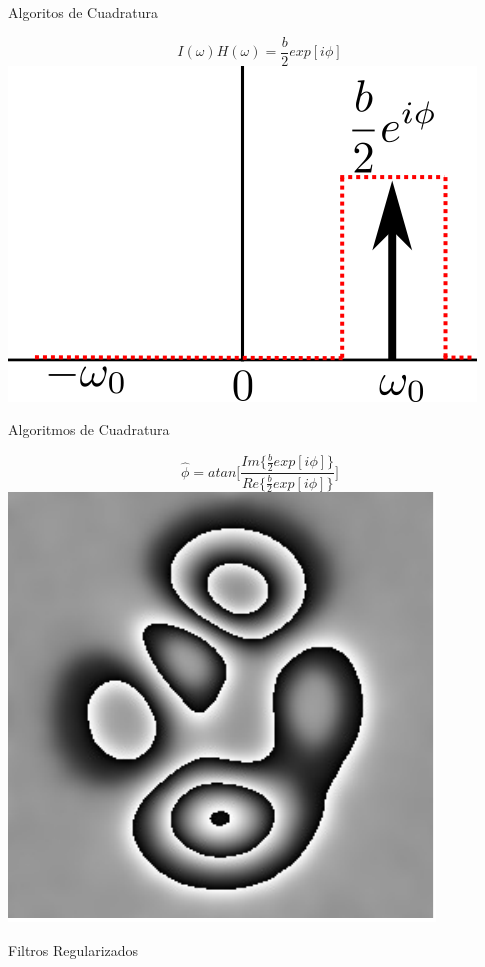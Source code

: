 \documentclass[]{beamer}
\begin{document}
\begin{frame}{Algoritos de Cuadratura}
\begin{center}

    \begin{equation}
             I(\omega) H(\omega) = \frac{b}{2}exp[i \phi]
     \end{equation}
     \includegraphics[scale=0.6]{Images/FourierDomine3.png}

  \end{center}
\end{frame}
\begin{frame}{Algoritmos de Cuadratura}
\begin{center}

  \begin{equation}
    \hat \phi=atan\bigg[ \frac{ Im\{\frac{b}{2}exp[i \phi]\} }{
      Re\{\frac{b}{2}exp[i \phi]\} } \bigg]
  \end{equation}
  \includegraphics[scale=0.6]{Images/wPhase.pdf}

\end{center}
\end{frame}
\begin{frame}{Filtros Regularizados}

\end{frame}
\end{document}
